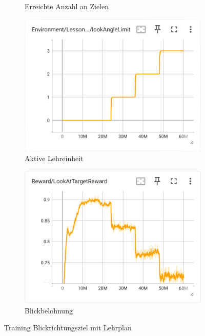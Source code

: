 \begin{figure}[H]
\begin{subfigure}{.49\textwidth}
      \caption{Erreichte Anzahl an Zielen}
      \label{fig:103_reach_target}
    \end{subfigure}
    \begin{subfigure}{.49\textwidth}
      \centering  
      \includegraphics[width=\textwidth]{img/103_look_angle_limit}
      \caption{Aktive Lehreinheit}
      \label{fig:103_look_angle_limit}
    \end{subfigure}
     \begin{subfigure}{.49\textwidth}
      \centering  
      \includegraphics[width=\textwidth]{img/103_look_reward}
      \caption{Blickbelohnung}
      \label{fig:103_look_reward}
    \end{subfigure}
  \caption{Training Blickrichtungsziel mit Lehrplan}
  \label{fig:training_blickrichtungsziel_lehrplan}
\end{figure}

